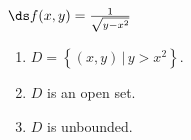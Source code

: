 {$\ds f(x,y) = \frac{1}{\sqrt{y-x^2}}$}
{\begin{enumerate}
\item $D = \left\{(x,y)\, |\, y> x^2\right\}$.
\item $D$ is an open set.
\item $D$ is unbounded.
\end{enumerate}
}